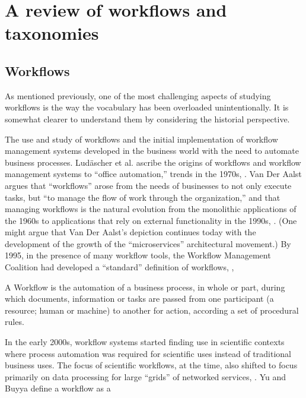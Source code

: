\chapter{A review of workflows and taxonomies}

\section{Workflows}\label{workflows}

As mentioned previously, one of the most challenging aspects of studying
workflows is the way the vocabulary has been overloaded unintentionally.
It is somewhat clearer to understand them by considering the historial
perspective.

The use and study of workflows and the initial implementation of
workflow management systems developed in the business world with the
need to automate business processes. Ludäscher et al. ascribe the
origins of workflows and workflow management systems to ``office
automation,'' trends in the 1970s, \cite{ludascher_scientific_2006}. Van Der
Aalst argues that ``workflows'' arose from the needs of businesses to not only
execute tasks, but ``to manage the flow of work through the
organization,'' and that managing workflows is the natural evolution
from the monolithic applications of the 1960s to applications that rely
on external functionality in the 1990s, \cite{van_der_aalst_application_1998}.
(One might argue that Van Der Aalst's depiction continues today with the
development of the growth of the ``microservices'' architectural
movement.) By 1995, in the presence of many workflow tools, the Workflow
Management Coalition had developed a ``standard'' definition of
workflows, \cite{hollingsworth_workflow_1993},

\begin{displayquote}
A Workflow is the automation of a business process, in whole or part, during
which documents, information or tasks are passed from one participant (a 
resource; human or machine) to another for action, according a set of 
procedural rules. 
\end{displayquote}

In the early 2000s, workflow systems started finding use in scientific
contexts where process automation was required for scientific uses
instead of traditional business uses. The focus of scientific workflows,
at the time, also shifted to focus primarily on data processing for
large ``grids'' of networked services, \cite{yu_taxonomy_2005}. Yu and Buyya
define a workflow as a

